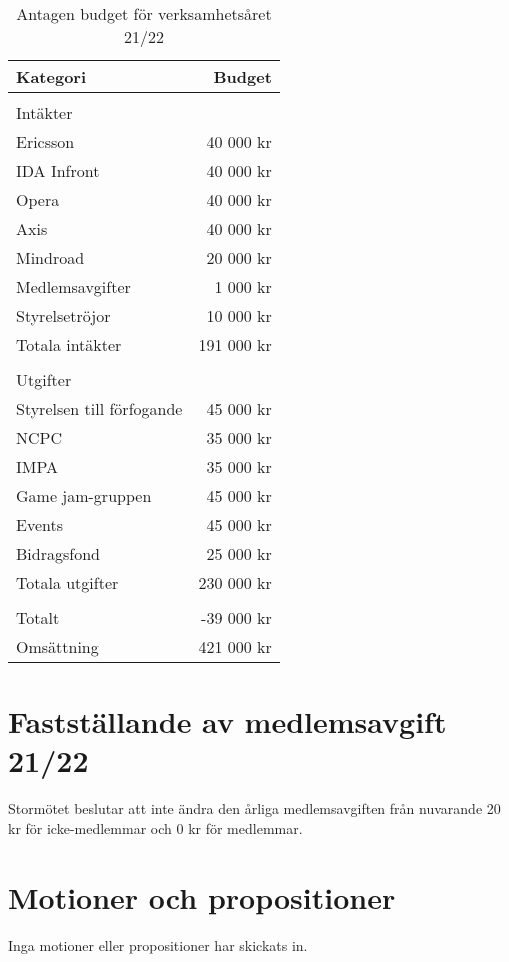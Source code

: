 \documentclass[a4paper]{article}
\begin{document}
\begin{table}[ht]
  \centering
  \caption{Antagen budget för verksamhetsåret 21/22}\label{tab:budget}
  \begin{tabular}{l r}
    Kategori & Budget \\
    \hline
    \\
    Intäkter \\
    Ericsson & 40 000 kr \\
    IDA Infront & 40 000 kr \\
    Opera & 40 000 kr \\
    Axis & 40 000 kr \\
    Mindroad & 20 000 kr \\
    Medlemsavgifter & 1 000 kr \\
    Styrelsetröjor & 10 000 kr \\
    \hline
    Totala intäkter & 191 000 kr \\
    \\
    Utgifter \\ 
    Styrelsen till förfogande & 45 000 kr \\
    NCPC & 35 000 kr \\
    IMPA & 35 000 kr \\
    Game jam-gruppen & 45 000 kr \\
    Events & 45 000 kr \\
    Bidragsfond & 25 000 kr \\
    \hline
    Totala utgifter & 230 000 kr \\
    \\
    Totalt & -39 000 kr \\
    Omsättning & 421 000 kr
  \end{tabular}
\end{table}

\section{Fastställande av medlemsavgift 21/22}

Stormötet beslutar att inte ändra den årliga medlemsavgiften från nuvarande 20 kr för icke-medlemmar
och 0 kr för medlemmar.

\section{Motioner och propositioner}

Inga motioner eller propositioner har skickats in.
\end{document}
